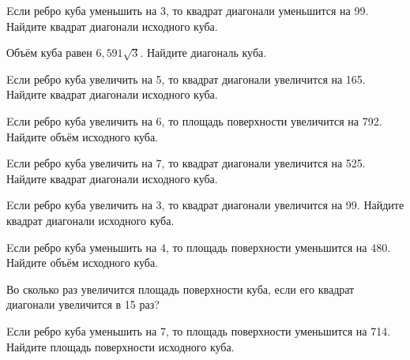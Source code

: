 \begin{taskBN}{19}
Eсли ребро куба уменьшить на 3, то квадрат диагонали уменьшится на 99. Найдите квадрат диагонали исходного куба.
\end{taskBN}

\begin{taskBN}{20}
Объём куба равен $6,591\sqrt{3}$. Найдите диагональ куба.
\end{taskBN}

\begin{taskBN}{21}
Eсли ребро куба увеличить на 5, то квадрат диагонали увеличится на 165. Найдите квадрат диагонали исходного куба.
\end{taskBN}

\begin{taskBN}{22}
Eсли ребро куба увеличить на 6, то площадь поверхности увеличится на 792. Найдите объём исходного куба.
\end{taskBN}

\begin{taskBN}{23}
Eсли ребро куба увеличить на 7, то квадрат диагонали увеличится на 525. Найдите квадрат диагонали исходного куба.
\end{taskBN}

\begin{taskBN}{24}
Eсли ребро куба увеличить на 3, то квадрат диагонали увеличится на 99. Найдите квадрат диагонали исходного куба.
\end{taskBN}

\begin{taskBN}{25}
Eсли ребро куба уменьшить на 4, то площадь поверхности уменьшится на 480. Найдите объём исходного куба.
\end{taskBN}

\begin{taskBN}{26}
Во сколько раз увеличится площадь поверхности куба, если его квадрат диагонали увеличится в 15 раз?
\end{taskBN}

\begin{taskBN}{27}
Eсли ребро куба уменьшить на 7, то площадь поверхности уменьшится на 714. Найдите площадь поверхности исходного куба.
\end{taskBN}

